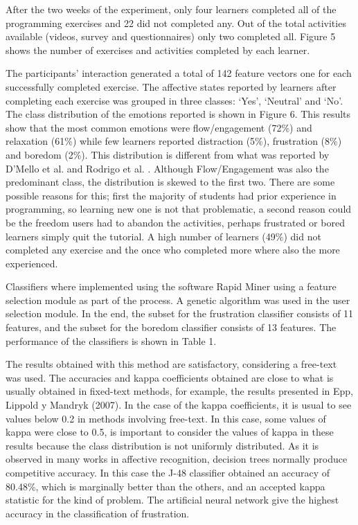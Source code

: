 \documentclass[conference]{IEEEtran}
\begin{document}
After the two weeks of the experiment, only four learners completed all of the
programming exercises and 22 did not completed any. Out of the total activities
available (videos, survey and questionnaires) only two completed all. Figure 5
shows the number of exercises and activities completed by each learner.
  
The participants' interaction generated a total of 142 feature vectors one for each
successfully completed exercise. The affective states reported by learners after
completing each exercise was grouped in three classes: ‘Yes’, ‘Neutral’ and
‘No’. The class distribution of the emotions reported is shown in Figure 6. This
results show that the most common emotions were flow/engagement (72\%) and
relaxation (61\%) while few learners reported distraction (5\%), frustration
(8\%) and boredom (2\%). This distribution is different from what was reported
by D’Mello et al. \cite{bixler2013detecting} and Rodrigo et al. \cite{rodrigo2009affective}.
Although Flow/Engagement was
also the predominant class, the distribution is skewed to the first two. There
are some possible reasons for this; first the majority of students had
prior experience in programming, so learning new one is not that problematic, a second
reason could be the freedom users had to abandon the activities, perhaps
frustrated or bored learners simply quit the tutorial. A high number of learners
(49\%) did not completed any exercise and the once who completed more where also
the more experienced.

Classifiers where implemented using the software Rapid Miner using a feature
selection module %
as part of the process. A genetic algorithm was used in the
user selection module. %
In the end, the subset for the frustration classifier
consists of 11 features, and the subset for the boredom classifier consists of
13 features. The performance of the classifiers is shown in Table 1. 

The results obtained with this method are satisfactory, considering a free-text
was used. %
The accuracies and kappa coefficients obtained are close to what is
usually obtained in fixed-text methods, for example, the results presented in
Epp, Lippold y Mandryk (2007). %
 In the case of the kappa coefficients, it is
usual to see values below 0.2 in methods involving free-text. In this case, some
values of kappa were close to 0.5, is important to consider the values of kappa
in these results because the class distribution is not uniformly distributed. As
it is observed in many works in affective recognition, decision trees normally
produce competitive accuracy. In this case the J-48 classifier obtained an
accuracy of 80.48\%, which is marginally better than the others, and an accepted kappa
statistic for the kind of problem. The artificial neural network %
give the highest
accuracy in the classification of frustration.
\end{document}
